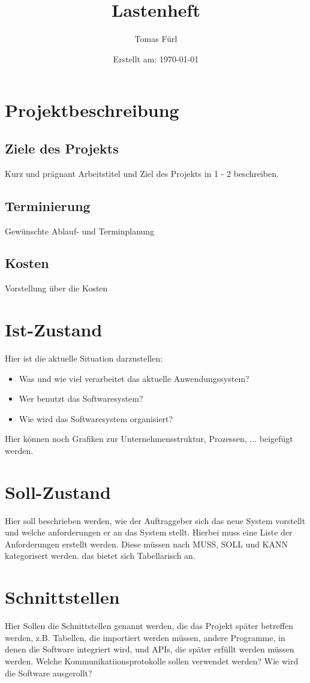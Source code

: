 \documentclass[a4paper, 12pt]{article}
\title{Lastenheft \Projektname}
\date{Erstellt am: \today}
\author{Tomas Fürl}
\begin{document}
    \maketitle
    \newpage

    \section{Projektbeschreibung}
    \subsection{Ziele des Projekts}
    Kurz und prägnant Arbeitstitel und Ziel des Projekts in 1 - 2 beschreiben.
    \subsection{Terminierung}
    Gewünschte Ablauf- und Terminplanung
    \subsection{Kosten}
    Vorstellung über die Kosten

    \section{Ist-Zustand}
    Hier ist die aktuelle Situation darzustellen:
    \begin{itemize}
        \item Was und wie viel verarbeitet das aktuelle Anwendungssystem?
        \item Wer benutzt das Softwaresystem?
        \item Wie wird das Softwaresystem organisiert?
    \end{itemize}
    Hier können noch Grafiken zur Unternehmensstruktur, Prozessen, ... beigefügt werden.

    \section{Soll-Zustand}
    Hier soll beschrieben werden, wie der Auftraggeber sich das neue System vorstellt und 
    welche anforderungen er an das System stellt.
    Hierbei muss eine Liste der Anforderungen erstellt werden.
    Diese müssen nach MUSS, SOLL und KANN kategorisert werden.
    das bietet sich Tabellarisch an.

    \section{Schnittstellen}
    Hier Sollen die Schnittstellen genannt werden, die das Projekt später betreffen werden, 
    z.B. Tabellen, die importiert werden müssen, andere Programme, in denen die Software 
    integriert wird, und APIs, die später erfüllt werden müssen werden.
    Welche Kommunikatiionsprotokolle sollen verwendet werden?
    Wie wird die Software ausgerollt?
\end{document}
